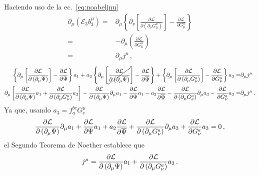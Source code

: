 Haciendo uso de la ec.~\eqref{eq:noabeljnu}
\begin{align}
  \partial_{\mu} \left(  \mathcal{E}_3 b_3^{\mu}   \right)=&
                                                \partial_{\mu} \left\{  \partial_\nu\left[\frac{\partial\mathcal{L}}{\partial\left(\partial_\nu G_\mu^a\right)}\right]-\frac{\partial\mathcal{L}}{\partial G_\mu^a}  \right\} \nonumber\\
  =&-\partial_{\mu}\left( \frac{\partial\mathcal{L}}{\partial G_\mu^a} \right) \nonumber\\
=& \partial_{\mu} j^{\mu}\,,
\end{align}
\begin{align}
  \left\{ \partial_{\mu}\left[{ \frac{\partial {\cal L}}{\partial \left( \partial_{\mu}\Psi \right)}}\right]-\frac{\partial{\cal L}}{\partial\Psi}  \right\}a_1+
  a_{2}\left\{ \partial_{\mu}\left[\cancel{ \frac{\partial {\cal L}}{\partial \left( \partial_{\mu}\overline{\Psi} \right)}}\right]-\frac{\partial{\cal L}}{\partial\overline{\Psi}}  \right\}+
  \left\{ \partial_\mu\left[\frac{\partial\mathcal{L}}{\partial\left(\partial_\mu G_\nu^a\right)}\right]-\frac{\partial\mathcal{L}}{\partial G_\nu^a} \right\} a_3 =&
 \partial_{\mu}j^{\mu}\nonumber\\
  \partial_{\mu}\left[ \frac{\partial {\cal L}}{\partial \left( \partial_{\mu}\Psi \right)}a_{1}+
  \frac{\partial\mathcal{L}}{\partial\left(\partial_\mu G_\nu^a\right)}a_{3}\right]
-\frac{\partial {\cal L}}{\partial \left( \partial_{\mu}\Psi \right)}\partial_{\mu} a_1
  -\frac{\partial{\cal L}}{\partial\Psi}a_{1}
  -a_2\frac{\partial{\cal L}}{\partial\overline{\Psi}}
  -\frac{\partial\mathcal{L}}{\partial\left(\partial_\mu G_\nu^a\right)}\partial_{\mu}a_{3}
  -\frac{\partial\mathcal{L}}{\partial G_\nu^a}a_{3}=&\partial_{\mu}j^{\mu}\,.
\end{align}
Ya que, usando $a_{3}=f_{a}^{bc} G^{\mu}_{c} $
\begin{align}
 \frac{\partial {\cal L}}{\partial \left( \partial_{\mu}\Psi \right)}\partial_{\mu} a_1
  +\frac{\partial{\cal L}}{\partial\Psi}a_{1}
  +a_{2}\frac{\partial{\cal L}}{\partial\overline{\Psi}}
  +\frac{\partial\mathcal{L}}{\partial\left(\partial_\mu G_\nu^a\right)}\partial_{\mu}a_{3}
  +\frac{\partial\mathcal{L}}{\partial G_\nu^a}a_{3}=0\,,
\end{align}
el Segundo Teorema de Noether establece que
\begin{align}
  j^{\mu}=\frac{\partial {\cal L}}{\partial \left( \partial_{\mu}\Psi \right)}a_{1}+
  \frac{\partial\mathcal{L}}{\partial\left(\partial_\mu G_\nu^a\right)}a_{3}\,.
\end{align}

